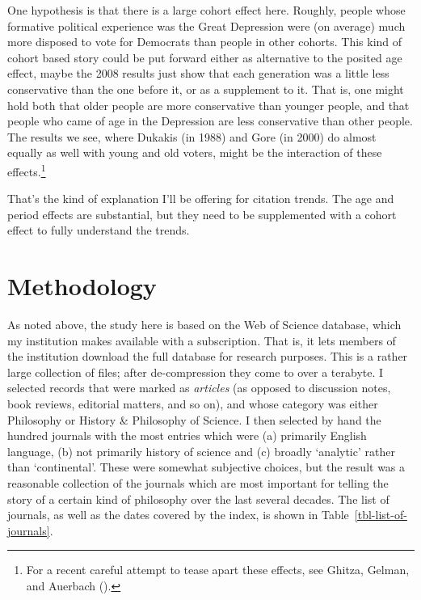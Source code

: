 \documentclass[
  10pt,
  letterpaper,
  DIV=11,
  numbers=noendperiod,
  twoside]{scrartcl}
\begin{document}
One hypothesis is that there is a large cohort effect here. Roughly,
people whose formative political experience was the Great Depression
were (on average) much more disposed to vote for Democrats than people
in other cohorts. This kind of cohort based story could be put forward
either as alternative to the posited age effect, maybe the 2008 results
just show that each generation was a little less conservative than the
one before it, or as a supplement to it. That is, one might hold both
that older people are more conservative than younger people, and that
people who came of age in the Depression are less conservative than
other people. The results we see, where Dukakis (in 1988) and Gore (in
2000) do almost equally as well with young and old voters, might be the
interaction of these effects.\footnote{For a recent careful attempt to
  tease apart these effects, see Ghitza, Gelman, and Auerbach
  ().}

That's the kind of explanation I'll be offering for citation trends. The
age and period effects are substantial, but they need to be supplemented
with a cohort effect to fully understand the trends.

\section{Methodology}\label{sec-methodology}

As noted above, the study here is based on the Web of Science database,
which my institution makes available with a subscription. That is, it
lets members of the institution download the full database for research
purposes. This is a rather large collection of files; after
de-compression they come to over a terabyte. I selected records that
were marked as \emph{articles} (as opposed to discussion notes, book
reviews, editorial matters, and so on), and whose category was either
Philosophy or History \& Philosophy of Science. I then selected by hand
the hundred journals with the most entries which were (a) primarily
English language, (b) not primarily history of science and (c) broadly
`analytic' rather than `continental'. These were somewhat subjective
choices, but the result was a reasonable collection of the journals
which are most important for telling the story of a certain kind of
philosophy over the last several decades. The list of journals, as well
as the dates covered by the index, is shown in
Table~\ref{tbl-list-of-journals}.
\end{document}
